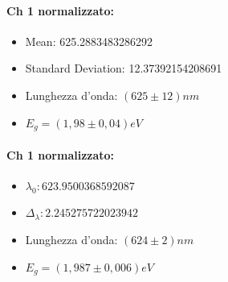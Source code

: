 \documentclass{article}
\begin{document}
\hrulefill
\begin{center}
    \begin{minipage}{0.4\textwidth}
        \paragraph{Ch 1 normalizzato:}
        \begin{itemize}
            \item Mean: 625.2883483286292
            \item Standard Deviation: 12.37392154208691
            \item Lunghezza d'onda:  $(625 \pm12)nm$
            \item $E_g=(  1,98\pm 0,04 )eV$
        \end{itemize}
    \end{minipage}
    \hfill
    \begin{minipage}{0.4\textwidth}
        \paragraph{Ch 1 normalizzato:}
        \begin{itemize}
            \item $\lambda_0: 623.9500368592087$
            \item $\Delta_\lambda: 2.245275722023942$
            \item Lunghezza d'onda:  $(624 \pm2)nm$
            \item $E_g=(  1,987\pm 0,006 )eV$
        \end{itemize}
    \end{minipage}
\end{center}
\hrulefill
\end{document}
